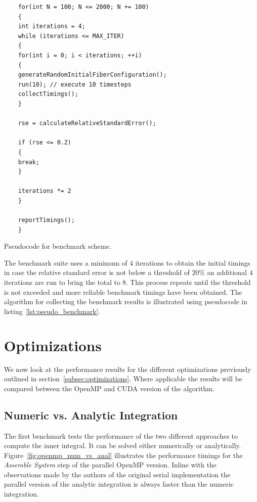 \documentclass[a4paper,11pt]{kth-mag}
\begin{document}
\begin{listing}[!htbp]
  \centering
  \begin{verbatim}
    for(int N = 100; N <= 2000; N += 100)
    {
    int iterations = 4;
    while (iterations <= MAX_ITER)
    {
    for(int i = 0; i < iterations; ++i)
    {
    generateRandomInitialFiberConfiguration();
    run(10); // execute 10 timesteps
    collectTimings();
    }

    rse = calculateRelativeStandardError();

    if (rse <= 0.2)
    {
    break;
    }

    iterations *= 2
    }

    reportTimings();
    }
  \end{verbatim}
  \caption{Pseudocode for benchmark scheme.}
  \label{lst:pseudo_benchmark}
\end{listing}

The benchmark suite uses a minimum of $4$ iterations to obtain the initial timings in case the relative standard error is not below a threshold of $20\%$ an additional $4$ iterations are run to bring the total to $8$. This process repeats until the threshold is not exceeded and more reliable benchmark timings have been obtained. The algorithm for collecting the benchmark results is illustrated using pseudocode in listing~\ref{lst:pseudo_benchmark}.

\section{Optimizations}

We now look at the performance results for the different optimizations previously outlined in section~\ref{subsec:optimizations}. Where applicable the results will be compared between the OpenMP and CUDA version of the algorithm.

\subsection{Numeric vs. Analytic Integration}

The first benchmark tests the performance of the two different approaches to compute the inner integral. It can be solved either numerically or analytically. Figure~\ref{fig:openmp_num_vs_anal} illustrates the performance timings for the \emph{Assemble System} step of the parallel OpenMP version. Inline with the observations made by the authors of the original serial implementation the parallel version of the analytic integration is always faster than the numeric integration.
\end{document}
